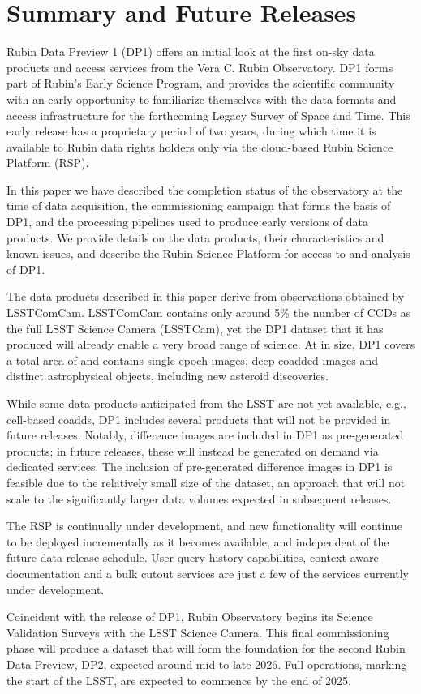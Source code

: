 \section{Summary and Future Releases}
\label{sec:summary}

Rubin Data Preview 1 (\gls{DP1}) offers an initial look at the first on-sky data products and access services from the Vera C. Rubin Observatory. \gls{DP1} forms part of Rubin's Early Science Program, and provides the scientific community with an early opportunity to familiarize themselves with the data formats and access infrastructure for the forthcoming Legacy Survey of Space and Time.
This early release has a proprietary period of two years, during which time it is  available to Rubin data rights holders only via the cloud-based Rubin Science Platform (\gls{RSP}).

In this paper we have described the completion status of the observatory at the time of data acquisition, the commissioning campaign that forms the basis of \gls{DP1}, and the processing pipelines used to produce early versions of data products.
We provide details on the data products, their characteristics and known issues, and describe the Rubin Science Platform for access to and analysis of DP1.

The data products described in this paper derive from observations obtained by \gls{LSSTComCam}. \gls{LSSTComCam} contains only around 5\% the number of CCDs as the full LSST Science Camera (LSSTCam), yet the DP1 dataset that it has produced will already enable a very broad range of science.
At \sizeinbytes in size, DP1 covers a total area of \totalarea and contains \nexposures single-\gls{epoch} images, \ndeepcoadds deep coadded images and \nobjects distinct astrophysical objects, including  \nnewasteroiddiscoveries  new asteroid discoveries.

While some data products anticipated from the LSST are not yet available, e.g., cell-based coadds, DP1 includes several products that will not be provided in future releases.
Notably, difference images are included in DP1 as pre-generated products; in future releases, these will instead be generated on demand via dedicated services.
The inclusion of pre-generated difference images in DP1 is feasible due to the relatively small size of the dataset, an approach that will not scale to the significantly larger data volumes expected in subsequent releases.

The \gls{RSP} is continually under development, and new functionality will continue to be deployed incrementally as it becomes available, and independent of the future data release schedule.
User query history capabilities, context-aware documentation and a bulk cutout services are just a few of the services currently under development.

Coincident with the release of DP1, Rubin Observatory begins its Science Validation Surveys with the LSST Science Camera.
This final commissioning phase will produce a dataset that will form the foundation for the second Rubin Data Preview, \gls{DP2}, expected around mid-to-late 2026.
Full operations, marking the start of the \gls{LSST}, are expected to commence by the end of 2025.